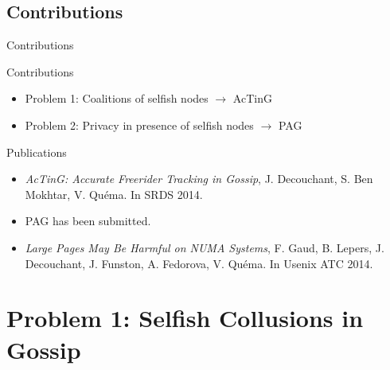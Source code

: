 \documentclass[10pt]{beamer}
\begin{document}
\subsection{Contributions}
\begin{frame}{Contributions}{}

  \begin{block}{Contributions}
     \begin{itemize}
        \item Problem 1: Coalitions of selfish nodes $\longrightarrow$ AcTinG
        \item Problem 2: Privacy in presence of selfish nodes $\longrightarrow$ PAG
     \end{itemize}
  \end{block}  
  \vfill
   \begin{block}{Publications}
      \begin{itemize}
         \item \textit{AcTinG: Accurate Freerider Tracking in Gossip}, J. Decouchant, S. Ben Mokhtar, V. Quéma. In SRDS 2014. 
         \item PAG has been submitted. 
         \vspace{0.5cm}
         \item \textit{Large  Pages May   Be Harmful  on NUMA  Systems}, F. Gaud, B. Lepers, J. Decouchant, J. Funston, A. Fedorova, V. Quéma. In Usenix ATC 2014. 
      \end{itemize}
  \end{block}

\end{frame}


\section{Problem 1: Selfish Collusions in Gossip}
\end{document}
